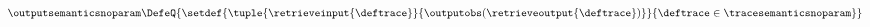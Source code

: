 
\begin{gather*}
  \outputsemanticsnoparam \DefeQ \{
    \setdef{
      \tuple{\retrieveinput{\deftrace}}{\outputobs(\retrieveoutput{\deftrace})}
    }{
      \deftrace \in \tracesemanticsnoparam
    }
  \}
\end{gather*}
